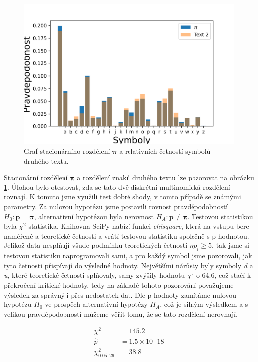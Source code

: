\documentclass[czech]{mvi-report}
\begin{document}
\begin{figure}[!h]
\includegraphics[width=\columnwidth]{img/pit2distr.png}
\caption{Graf stacionárního rozdělení $ \bm{\pi} $ a relativních četností symbolů druhého textu.}
\label{fig:pitd}
\end{figure}

Stacionární rozdělení $ \bm{\pi} $ a rozdělení znaků druhého textu lze pozorovat na obrázku \ref{fig:pitd}. Úlohou bylo otestovat, zda se tato dvě diskrétní multinomická rozdělení rovnají. K tomuto jsme využili test dobré shody, v tomto případě se známými parametry. Za nulovou hypotézu jsme postavili rovnost pravděpodobností $ H_0: \bm{p}=\bm{\pi} $, alternativní hypotézou byla nerovnost $ H_A: \bm{p}\neq \bm{\pi} $. Testovou statistikou byla $ \chi^2 $ statistika. Knihovna SciPy nabízí funkci \textit{chisquare}, která na vstupu bere naměřené a teoretické četnosti a vrátí testovou statistiku společně s p-hodnotou. Jelikož data nesplňují všude podmínku teoretických četností $ np_i \geq 5 $, tak jsme si testovou statistiku naprogramovali sami, a pro každý symbol jsme pozorovali, jak tyto četnosti přispívají do výsledné hodnoty. Největšími nárůsty byly symboly \textit{d} a \textit{u}, které teoretické četnosti splňovaly, samy zvýšily hodnotu $ \chi^2 $ o 64.6, což stačí k překročení kritické hodnoty, tedy na základě tohoto pozorování považujeme výsledek za správný i přes nedostatek dat. Dle p-hodnoty zamítáme nulovou hypotézu $ H_0 $ ve prospěch alternativní hypotézy $ H_A $, což je silným výsledkem a s velikou pravděpodobností můžeme věřit tomu, že se tato rozdělení nerovnají.

\begin{align*}
\chi^2 &= 145.2\\
\hat{p} &= 1.5 \times 10^-18\\
\chi^2_{0.05,26} &= 38.8
\end{align*}
\end{document}
